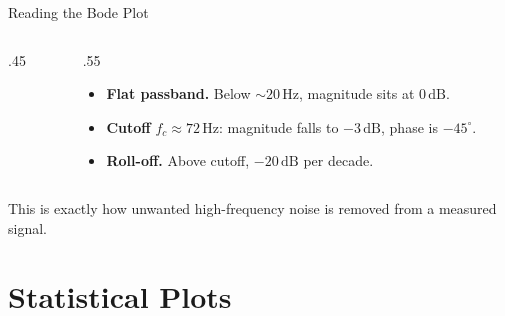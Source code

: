 \documentclass[9pt,aspectratio=169,xcolor=table]{beamer}
\begin{document}
\begin{frame}{Reading the Bode Plot}
    \leavevmode
    \small
    \begin{columns}[t]
        \begin{column}{.45\textwidth}
            \begin{center}
            \end{center}
        \end{column}
        \begin{column}{.55\textwidth}
            \begin{itemize}
                \item \textbf{Flat passband.} Below $\sim\!20\,\text{Hz}$,
                      magnitude sits at $0\,\text{dB}$.
                \item \textbf{Cutoff} $f_c \approx 72\,\text{Hz}$: magnitude
                      falls to $-3\,\text{dB}$, phase is $-45^\circ$.
                \item \textbf{Roll-off.} Above cutoff, $-20\,\text{dB}$ per
                      decade.
            \end{itemize}
        \end{column}
    \end{columns}

    \vspace{2mm}
    {\small This is exactly how unwanted high-frequency noise is removed
    from a measured signal.}
\end{frame}

\section{Statistical Plots}
\end{document}
